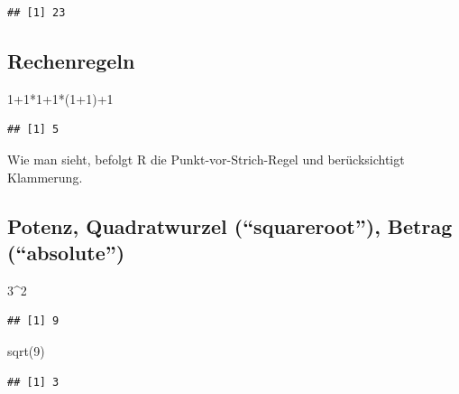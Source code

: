 \documentclass[
]{book}
\newenvironment{Shaded}{\begin{snugshade}}{\end{snugshade}}
\newcommand{\DecValTok}[1]{\textcolor[rgb]{0.00,0.00,0.81}{#1}}
\newcommand{\FunctionTok}[1]{\textcolor[rgb]{0.00,0.00,0.00}{#1}}
\newcommand{\NormalTok}[1]{#1}
\newcommand{\SpecialCharTok}[1]{\textcolor[rgb]{0.00,0.00,0.00}{#1}}
\begin{document}
\begin{verbatim}
## [1] 23
\end{verbatim}

\hypertarget{rechenregeln}{%
\subsection*{Rechenregeln}\label{rechenregeln}}

\begin{Shaded}
\begin{Highlighting}[]
\DecValTok{1}\SpecialCharTok{+}\DecValTok{1}\SpecialCharTok{*}\DecValTok{1}\SpecialCharTok{+}\DecValTok{1}\SpecialCharTok{*}\NormalTok{(}\DecValTok{1}\SpecialCharTok{+}\DecValTok{1}\NormalTok{)}\SpecialCharTok{+}\DecValTok{1}
\end{Highlighting}
\end{Shaded}

\begin{verbatim}
## [1] 5
\end{verbatim}

Wie man sieht, befolgt R die Punkt-vor-Strich-Regel und berücksichtigt Klammerung.

\hypertarget{potenz-quadratwurzel-squareroot-betrag-absolute}{%
\subsection*{Potenz, Quadratwurzel (``squareroot''), Betrag (``absolute'')}\label{potenz-quadratwurzel-squareroot-betrag-absolute}}

\begin{Shaded}
\begin{Highlighting}[]
\DecValTok{3}\SpecialCharTok{\^{}}\DecValTok{2}
\end{Highlighting}
\end{Shaded}

\begin{verbatim}
## [1] 9
\end{verbatim}

\begin{Shaded}
\begin{Highlighting}[]
\FunctionTok{sqrt}\NormalTok{(}\DecValTok{9}\NormalTok{)}
\end{Highlighting}
\end{Shaded}

\begin{verbatim}
## [1] 3
\end{verbatim}
\end{document}
